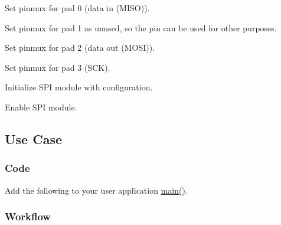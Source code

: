 \begin{DoxyEnumerate}
\begin{DoxyEnumerate}
\item Set pinmux for pad 0 (data in (M\+I\+SO)). 
\begin{DoxyCodeInclude}{0}
\end{DoxyCodeInclude}

\item Set pinmux for pad 1 as unused, so the pin can be used for other purposes. 
\begin{DoxyCodeInclude}{0}
\end{DoxyCodeInclude}

\item Set pinmux for pad 2 (data out (M\+O\+SI)). 
\begin{DoxyCodeInclude}{0}
\end{DoxyCodeInclude}

\item Set pinmux for pad 3 (S\+CK). 
\begin{DoxyCodeInclude}{0}
\end{DoxyCodeInclude}

\item Initialize S\+PI module with configuration. 
\begin{DoxyCodeInclude}{0}
\end{DoxyCodeInclude}

\item Enable S\+PI module. 
\begin{DoxyCodeInclude}{0}
\end{DoxyCodeInclude}
 
\end{DoxyEnumerate}
\end{DoxyEnumerate}\hypertarget{asfdoc_sam0_sercom_spi_master_basic_use_asfdoc_sam0_sercom_spi_master_basic_use_case}{}\subsection{Use Case}\label{asfdoc_sam0_sercom_spi_master_basic_use_asfdoc_sam0_sercom_spi_master_basic_use_case}
\hypertarget{asfdoc_sam0_sercom_spi_master_basic_use_asfdoc_sam0_sercom_spi_master_basic_use_case_code}{}\subsubsection{Code}\label{asfdoc_sam0_sercom_spi_master_basic_use_asfdoc_sam0_sercom_spi_master_basic_use_case_code}
Add the following to your user application {\ttfamily \mbox{\hyperlink{csc__app_8c_a840291bc02cba5474a4cb46a9b9566fe}{main()}}}. 
\begin{DoxyCodeInclude}{0}
\end{DoxyCodeInclude}
\hypertarget{asfdoc_sam0_sercom_spi_master_basic_use_asfdoc_sam0_sercom_spi_master_basic_use_case_workflow}{}\subsubsection{Workflow}\label{asfdoc_sam0_sercom_spi_master_basic_use_asfdoc_sam0_sercom_spi_master_basic_use_case_workflow}

